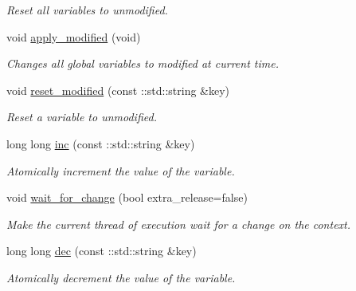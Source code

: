 \begin{DoxyCompactItemize}
\begin{DoxyCompactList}\small\item\em Reset all variables to unmodified. \item\end{DoxyCompactList}\item 
void \hyperlink{classMadara_1_1Knowledge__Engine_1_1Thread__Safe__Context_ab5601f950f83aa7e2da49c8fea345889}{apply\_\-modified} (void)
\begin{DoxyCompactList}\small\item\em Changes all global variables to modified at current time. \item\end{DoxyCompactList}\item 
void \hyperlink{classMadara_1_1Knowledge__Engine_1_1Thread__Safe__Context_a5eef60377d621f3997fe0337acae29d2}{reset\_\-modified} (const ::std::string \&key)
\begin{DoxyCompactList}\small\item\em Reset a variable to unmodified. \item\end{DoxyCompactList}\item 
long long \hyperlink{classMadara_1_1Knowledge__Engine_1_1Thread__Safe__Context_acedbd87418912605880c87f2b99d0c9c}{inc} (const ::std::string \&key)
\begin{DoxyCompactList}\small\item\em Atomically increment the value of the variable. \item\end{DoxyCompactList}\item 
void \hyperlink{classMadara_1_1Knowledge__Engine_1_1Thread__Safe__Context_ae6373c01752d65907a1d43fbfdbc4870}{wait\_\-for\_\-change} (bool extra\_\-release=false)
\begin{DoxyCompactList}\small\item\em Make the current thread of execution wait for a change on the context. \item\end{DoxyCompactList}\item 
long long \hyperlink{classMadara_1_1Knowledge__Engine_1_1Thread__Safe__Context_ad9b23351339a10a79e75b3e590337d9c}{dec} (const ::std::string \&key)
\begin{DoxyCompactList}\small\item\em Atomically decrement the value of the variable. \item\end{DoxyCompactList}\item 

\end{DoxyCompactItemize}

